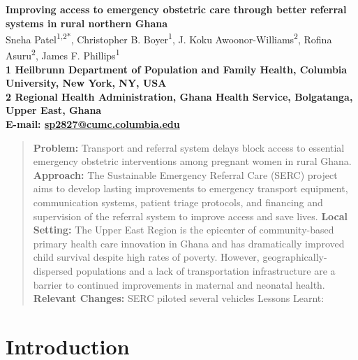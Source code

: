 \documentclass[10pt]{article}
\date{}
\begin{document}
\begin{flushleft}
{\Large
\textbf{Improving access to emergency obstetric care through better referral
systems in rural northern Ghana}
}
\\
  Sneha Patel\textsuperscript{1,2*},
  Christopher B. Boyer\textsuperscript{1},
  J. Koku Awoonor-Williams\textsuperscript{2},
  Rofina Asuru\textsuperscript{2},
  James F. Phillips\textsuperscript{1}\\
\bf{1} Heilbrunn Department of Population and Family Health, Columbia University,  New York,  NY,  USA
\\
\bf{2} Regional Health Administration, Ghana Health Service,  Bolgatanga,  Upper East,  Ghana
\\

\textasteriskcentered{} E-mail:   \href{mailto:sp2827@cumc.columbia.edu}{sp2827@cumc.columbia.edu}
  
  
  
  

\end{flushleft}

\begin{quote}
\textbf{Problem:} Transport and referral system delays block access to
essential emergency obstetric interventions among pregnant women in
rural Ghana. \newline{} \textbf{Approach:} The Sustainable Emergency
Referral Care (SERC) project aims to develop lasting improvements to
emergency transport equipment, communication systems, patient triage
protocols, and financing and supervision of the referral system to
improve access and save lives. \newline{} \textbf{Local Setting:} The
Upper East Region is the epicenter of community-based primary health
care innovation in Ghana and has dramatically improved child survival
despite high rates of poverty. However, geographically-dispersed
populations and a lack of transportation infrastructure are a barrier to
continued improvements in maternal and neonatal health.\newline{}
\textbf{Relevant Changes:} SERC piloted several vehicles Lessons Learnt:
\end{quote}

\section*{Introduction}\label{introduction}
\end{document}
